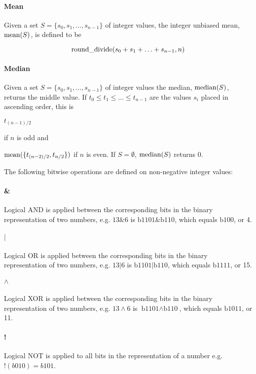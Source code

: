 \paragraph*{Mean} Given a set  $S=\{s_0, s_1, \hdots, s_{n-1}\}$ of integer values, the integer unbiased mean, $\operatorname{mean}(S)$, is defined
to be

\[\operatorname{round\_divide}(s_0+s_1+\hdots +s_{n-1},n)\]

\paragraph*{Median} Given a set $S=\{s_0, s_1, \hdots, s_{n-1} \}$ of integer values the median, $\operatorname{median}(S)$, 
returns the middle value. If $t_0\leq t_1\leq \hdots \leq t_{n-1}$ are the values $s_i$ placed in ascending order, this
is 

$t_{(n-1)/2}$ 

if $n$ is odd and

$\operatorname{mean}(\{ t_{(n-2)/2},t_{n/2}\})$ if $n$ is even. If $S=\emptyset$, $\operatorname{median}(S)$ returns 0.

The following bitwise operations are defined on non-negative integer values:
\paragraph*{\&} Logical AND is applied between the corresponding bits in the binary representation of two numbers, e.g.
$13\&6$ is $\text{b1101}\&\text{b110}$, which equals $\text{b100}$, or 4.

\paragraph*{${\mathbf |}$} Logical OR is applied between the corresponding bits in the binary representation of two numbers, e.g.
$13|6$ is $\text{b1101}\text{|}\text{b110}$, which equals $\text{b1111}$, or 15.

\paragraph*{${\mathbf \wedge}$} Logical XOR is applied between the corresponding bits in the binary representation of two numbers, e.g.
$13\wedge 6$ is $\text{b1101}\wedge\text{b110}$, which equals $\text{b1011}$, or 11.

\paragraph*{!} Logical NOT is applied to all bits in the representation of a number e.g. $!(b010)=b101$.

